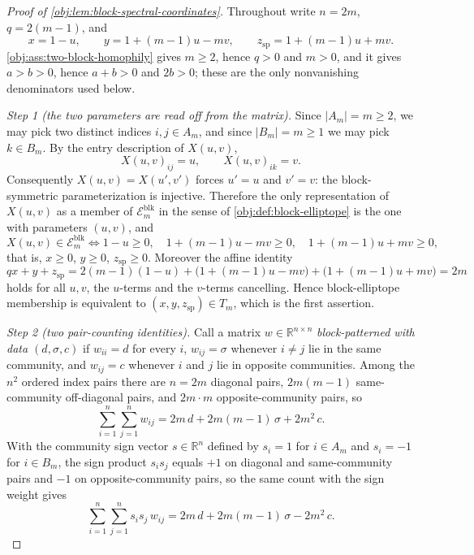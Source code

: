 \begin{proof}[Proof of \cref{obj:lem:block-spectral-coordinates}]
Throughout write \(n=2m\), \(q=2(m-1)\), and
\[
x=1-u,\qquad
y=1+(m-1)u-mv,\qquad
z_{\mathrm{sp}}=1+(m-1)u+mv .
\]
\cref{obj:ass:two-block-homophily} gives \(m\ge2\), hence \(q>0\) and \(m>0\), and it gives \(a>b>0\), hence \(a+b>0\) and \(2b>0\); these are the only nonvanishing denominators used below.

\emph{Step 1 (the two parameters are read off from the matrix).}  Since \(|A_m|=m\ge2\), we may pick two distinct indices \(i,j\in A_m\), and since \(|B_m|=m\ge1\) we may pick \(k\in B_m\).  By the entry description of \(X(u,v)\),
\[
X(u,v)_{ij}=u,
\qquad
X(u,v)_{ik}=v .
\]
Consequently \(X(u,v)=X(u',v')\) forces \(u'=u\) and \(v'=v\): the block-symmetric parameterization is injective.  Therefore the only representation of \(X(u,v)\) as a member of \(\mathcal E_m^{\mathrm{blk}}\) in the sense of \cref{obj:def:block-elliptope} is the one with parameters \((u,v)\), and
\[
X(u,v)\in\mathcal E_m^{\mathrm{blk}}
\iff
1-u\ge0,\quad
1+(m-1)u-mv\ge0,\quad
1+(m-1)u+mv\ge0,
\]
that is, \(x\ge0\), \(y\ge0\), \(z_{\mathrm{sp}}\ge0\).  Moreover the affine identity
\[
qx+y+z_{\mathrm{sp}}
=2(m-1)(1-u)+\bigl(1+(m-1)u-mv\bigr)+\bigl(1+(m-1)u+mv\bigr)
=2m
\]
holds for all \(u,v\), the \(u\)-terms and the \(v\)-terms cancelling.  Hence block-elliptope membership is equivalent to \((x,y,z_{\mathrm{sp}})\in T_m\), which is the first assertion. %

\emph{Step 2 (two pair-counting identities).}  Call a matrix \(w\in\mathbb R^{n\times n}\) \emph{block-patterned with data \((d,\sigma,c)\)} if \(w_{ii}=d\) for every \(i\), \(w_{ij}=\sigma\) whenever \(i\ne j\) lie in the same community, and \(w_{ij}=c\) whenever \(i\) and \(j\) lie in opposite communities.  Among the \(n^2\) ordered index pairs there are \(n=2m\) diagonal pairs, \(2m(m-1)\) same-community off-diagonal pairs, and \(2m\cdot m\) opposite-community pairs, so
\[
\sum_{i=1}^{n}\sum_{j=1}^{n}w_{ij}
=2m\,d+2m(m-1)\,\sigma+2m^2\,c .
\]
With the community sign vector \(s\in\mathbb R^{n}\) defined by \(s_i=1\) for \(i\in A_m\) and \(s_i=-1\) for \(i\in B_m\), the sign product \(s_is_j\) equals \(+1\) on diagonal and same-community pairs and \(-1\) on opposite-community pairs, so the same count with the sign weight gives
\[
\sum_{i=1}^{n}\sum_{j=1}^{n}s_is_j\,w_{ij}
=2m\,d+2m(m-1)\,\sigma-2m^2\,c .
\]


\end{proof}
